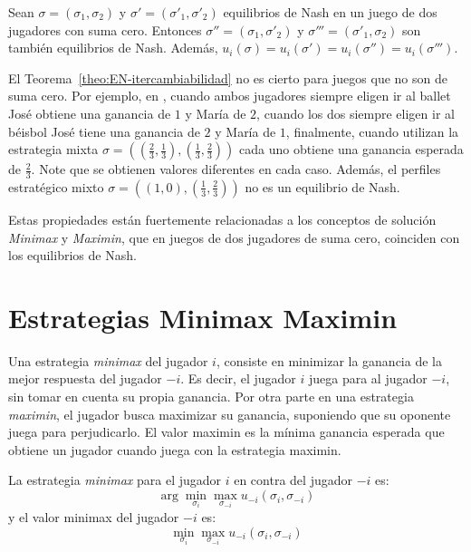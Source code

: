 \begin{theorem}
\label{theo:EN-itercambiabilidad}
Sean $\sigma = (\sigma_1, \sigma_2)$ y $\sigma' = (\sigma'_1, \sigma'_2)$ equilibrios de Nash en un juego de dos jugadores con suma cero. Entonces $\sigma'' = (\sigma_1, \sigma'_2)$ y $\sigma''' = (\sigma'_1, \sigma_2)$ son también equilibrios de Nash. Además, $u_i(\sigma) = u_i(\sigma') = u_i(\sigma'') = u_i(\sigma''')$.
\end{theorem}

El Teorema~\ref{theo:EN-itercambiabilidad} no es cierto para juegos que no son de suma cero. Por ejemplo, en , cuando ambos jugadores siempre eligen ir al ballet José obtiene una ganancia de $1$ y María de $2$, cuando los dos siempre eligen ir al béisbol José tiene una ganancia de $2$ y María de $1$, finalmente, cuando utilizan la estrategia mixta $\sigma = \left(\left(\frac{2}{3}, \frac{1}{3}\right), \left(\frac{1}{3}, \frac{2}{3}\right)\right)$ cada uno obtiene una ganancia esperada de $\frac{2}{3}$. Note que se obtienen valores diferentes en cada caso. Además, el perfiles estratégico mixto $\sigma = \left((1, 0), \left(\frac{1}{3}, \frac{2}{3}\right)\right)$ no es un equilibrio de Nash.

Estas propiedades están fuertemente relacionadas a los conceptos de solución \textit{Minimax} y \textit{Maximin}, que en juegos de dos jugadores de suma cero, coinciden con los equilibrios de Nash.

\section{Estrategias Minimax Maximin}

Una estrategia \textit{minimax} del jugador $i$, consiste en minimizar la ganancia de la mejor respuesta del jugador $-i$. Es decir, el jugador $i$ juega para  al jugador $-i$, sin tomar en cuenta su propia ganancia. Por otra parte en una estrategia \textit{maximin}, el jugador busca maximizar su ganancia, suponiendo que su oponente juega para perjudicarlo. El valor maximin es la mínima ganancia esperada que obtiene un jugador cuando juega con la estrategia maximin. 

\begin{definition}
La estrategia \textit{minimax} para el jugador $i$ en contra del jugador $-i$ es:
$$\arg \min_{\sigma_i}{\max_{\sigma_{-i}}{u_{-i}(\sigma_i, \sigma_{-i})}}$$
y el valor minimax del jugador $-i$ es:
$$\min_{\sigma_i}{\max_{\sigma_{-i}}{u_{-i}(\sigma_i, \sigma_{-i})}}$$
\end{definition}

